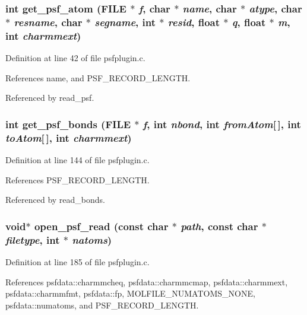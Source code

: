 \subsubsection{\setlength{\rightskip}{0pt plus 5cm}int get\_\-psf\_\-atom (FILE $\ast$ {\em f}, char $\ast$ {\em name}, char $\ast$ {\em atype}, char $\ast$ {\em resname}, char $\ast$ {\em segname}, int $\ast$ {\em resid}, float $\ast$ {\em q}, float $\ast$ {\em m}, int {\em charmmext})\hspace{0.3cm}{\tt  [static]}}\label{psfplugin_8c_a2}




Definition at line 42 of file psfplugin.c.

References name, and PSF\_\-RECORD\_\-LENGTH.

Referenced by read\_\-psf.
\subsubsection{\setlength{\rightskip}{0pt plus 5cm}int get\_\-psf\_\-bonds (FILE $\ast$ {\em f}, int {\em nbond}, int {\em from\-Atom}[$\,$], int {\em to\-Atom}[$\,$], int {\em charmmext})\hspace{0.3cm}{\tt  [static]}}\label{psfplugin_8c_a4}




Definition at line 144 of file psfplugin.c.

References PSF\_\-RECORD\_\-LENGTH.

Referenced by read\_\-bonds.
\subsubsection{\setlength{\rightskip}{0pt plus 5cm}void$\ast$ open\_\-psf\_\-read (const char $\ast$ {\em path}, const char $\ast$ {\em filetype}, int $\ast$ {\em natoms})\hspace{0.3cm}{\tt  [static]}}\label{psfplugin_8c_a5}




Definition at line 185 of file psfplugin.c.

References psfdata::charmmcheq, psfdata::charmmcmap, psfdata::charmmext, psfdata::charmmfmt, psfdata::fp, MOLFILE\_\-NUMATOMS\_\-NONE, psfdata::numatoms, and PSF\_\-RECORD\_\-LENGTH.
